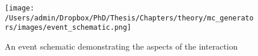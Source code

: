 \begin{figure}[h]
	\texttt{[image: /Users/admin/Dropbox/PhD/Thesis/Chapters/theory/mc\_generators/images/event\_schematic.png]}
	\caption{An event schematic demonstrating the aspects of the interaction \cite{Field:2002vt}}
	\label{fig: event schematic}
\end{figure}


%






	

